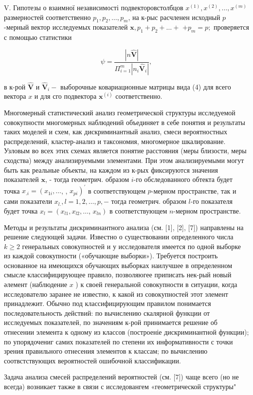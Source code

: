 \documentclass[10pt]{article}
\begin{document}
V. Гипотезы о взаимної независимості подвекторовстолбцов $x^{(1)}, x^{(2)}, \ldots, x^{(m)}$ размерностей соответственно $p_{1}, p_{2}, \ldots, p_{m}$, на к-рыс расчленен исходный $p$-мерный вектор исследуемых показателей $\boldsymbol{x}, p_{1}+p_{2}+\ldots+$ $+p_{m}=p ;$ проверяется с помощью статистики



\[

\psi=\frac{|n \hat{\boldsymbol{V}}|}{\Pi_{i=1}^{m}\left|n_{i} \hat{\boldsymbol{V}}_{i}\right|},

\]



в к-рой $\hat{\boldsymbol{V}}$ и $\hat{\boldsymbol{V}}_{i}-$ выборочные ковариационные матрицы вида (4) для всего вектора $x$ и для сго подвектора $\boldsymbol{x}^{(i)}$ соответственно.



Многомерный статистический анализ геометрической структуры исследуемой совокупности многомерных наблюдений объединяет в себе понятия и результаты таких моделей и схем, как дискриминантный анализ, смеси вероятностных распределений, кластер-анализ и таксономия, многомерное шкалирование. Узловым во всех этих схемах является понятие расстояния (меры близости, меры сходства) между анализируемыми элементами. При этом анализируемыми могут быть как реальные объекты, на каждом из к-рых фиксируются значения показателей $\boldsymbol{x}$, - тогда геометрич. образом $i$-го обследованного обтекта будет точка $x_{. i}=\left(x_{1 i}, \ldots\right.$, , $\left.x_{p i}\right)^{\prime}$ в соответствующем $p$-мерном пространстве, так и сами показатели $x_{l .}, l=1,2, \ldots, p,-$ тогда геометрич. образом $l$-го показателя будет точка $x_{l}=\left(x_{l 1}, x_{l 2}, \ldots\right.$, $\left.x_{l n}\right)$ в соответствующем $n$-мерном пространстве.



Методы и результаты дискриминантного анализа (см. [1], [2], [7]) направлены на решение следующей задачи. Известно о существовании определенного числа $k \geqslant 2$ генеральных совокупностей и у исследователя имеется по одной выборке из каждой совокупности («обучающие выборки»). Требуется построить основанное на имеющихся обучающих выборках наилучшее в определенном смысле классифицирующее правило, позволяюгее приписать нек-рый новый әлемент (наблюдение $x$ ) к своей генеральной совокупности в ситуации, когда исследователю заранее не известно, к какой из совокупностей этот элемент принадлежит. Обычно под классифицирующим правилом понимается последовательность действий: по вычислению скалярной функции от исследуемых показателей, по значениям к-рой принимается решение об отнесении элемента к одному из классов (построеніе дискриминантной функции); по упорядочениг самих показателей по степени их информативности с точки зрения правильного отнесения элементов к классам; по вычислению соотвстствующих вероятностей ошибочной классификации.



Задача анализа смесей распределений вероятностей (см. [7]) чаще всего (но не всегда) возникает также в связи с исследовангем «геометрической структуры"
\end{document}
